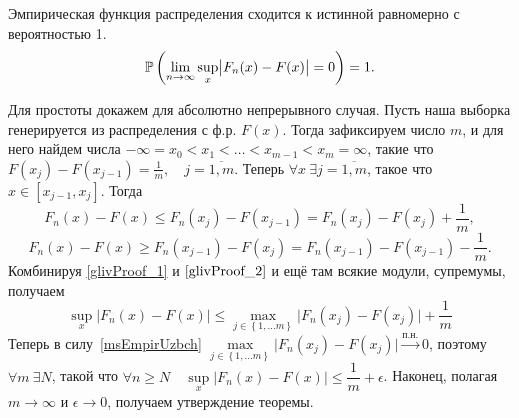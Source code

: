 \documentclass[../TV&MS.tex]{subfiles}
\begin{document}
\begin{Th}[Гливенко]
    Эмпирическая функция распределения сходится к истинной равномерно с вероятностью 1.
    \begin{equation}
        \mathbb{P} \left( \lim\limits_{n \rightarrow \infty} \sup_{x} \bigl| F_n(x) - F(x) \bigr| = 0 \right) = 1.
    \end{equation} 
\end{Th} 

\begin{Proof}
    Для простоты докажем для абсолютно непрерывного случая.
    Пусть наша выборка генерируется из распределения с ф.р. $F(x)$.
    Тогда зафиксируем число $m$, и для него найдем числа
    $-\infty = x_0 < x_1 <\ldots< x_{m-1} < x_m = \infty$,
    такие что $F(x_j) - F(x_{j-1}) = \frac{1}{m}, \quad j = \overline{1,m}$.
    Теперь $\forall x\ \exists j=\overline{1,m}$, такое что $x \in \left[ x_{j-1}, x_j \right]$. Тогда
    \begin{equation}\label{glivProof_1}
        F_n(x)-F(x) \leqslant F_n(x_j)-F(x_{j-1})=F_n(x_j)-F(x_j)+\frac{1}{m},
    \end{equation}
    \begin{equation}\label{glivProof_2}
        F_n(x)-F(x) \geqslant F_n(x_{j-1})-F(x_{j})=F_n(x_{j-1})-F(x_{j-1})-\frac{1}{m}.
    \end{equation}
    Комбинируя \eqref{glivProof_1} и $\eqref{glivProof_2}$ и ещё там всякие модули, супремумы, получаем
    \begin{equation}
        \sup_x \bigl| F_n(x) - F(x) \bigr| \leqslant
        \max_{j \in \left\{ 1,\ldots m \right\}} 
        \bigl|F_n(x_j) - F(x_j) \bigr| + \frac{1}{m}
    \end{equation} 
    Теперь в силу~\eqref{msEmpirUzbch} 
    $\max\limits_{j \in \left\{ 1,\ldots m \right\}} \bigl|F_n(x_j) - F(x_j) \bigr|
    \xrightarrow{\text{п.н.}} 0$, поэтому $\forall m\ \exists N$,
    такой что $\forall n \geqslant N \quad \sup\limits_x \bigl| F_n(x) - F(x) \bigr| \leqslant \dfrac{1}{m} + \epsilon$.
    Наконец, полагая $m \rightarrow \infty$ и $\epsilon \rightarrow 0$,
    получаем утверждение теоремы.
\end{Proof} 
\end{document}
